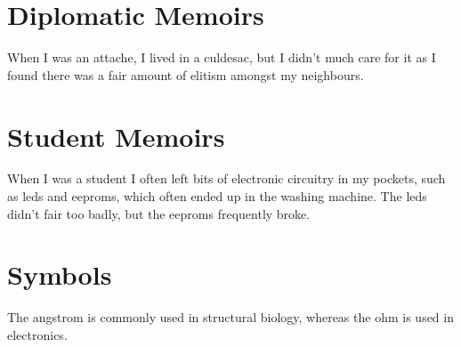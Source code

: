 \documentclass{article}
\begin{document}
\tableofcontents

\section{Diplomatic Memoirs}

When I was an \gls{attache}, I lived in a \gls{culdesac}, but
I didn't much care for it as I found there was a fair amount
of \gls{elitism} amongst my neighbours.

\section{Student Memoirs}

When I was a student I often left bits of electronic circuitry
in my pockets, such as \glspl{led} and \glspl{eeprom}, which
often ended up in the washing machine. The \glspl{led} didn't
fair too badly, but the \glspl{eeprom} frequently broke.

\section{Symbols}

The \gls{angstrom} is commonly used in structural biology,
whereas the \gls{ohm} is used in electronics.

\printglossaries
\end{document}
